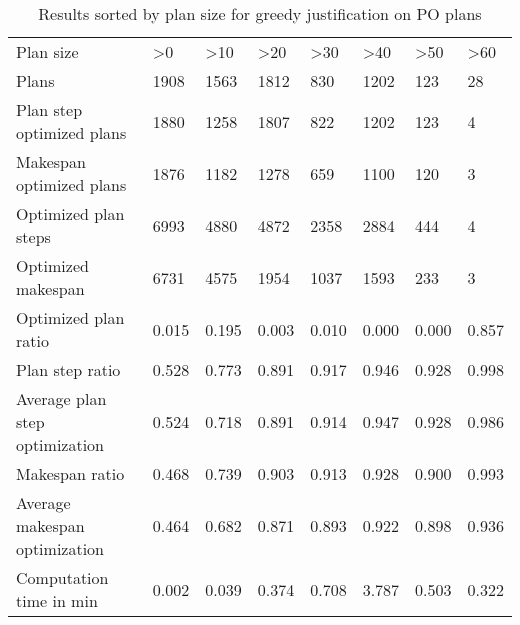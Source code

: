 \begin{table}[]
\begin{tabular}{llllllll}
\cline{1-8}
Plan size                     & \textgreater{}0 & \textgreater{}10 & \textgreater{}20 & \textgreater{}30 & \textgreater{}40 & \textgreater{}50 & \textgreater{}60 \\ \cline{1-8}
Plans                          & 1908            & 1563             & 1812             & 830              & 1202             & 123              & 28               \\
Plan step optimized plans      & 1880            & 1258             & 1807             & 822              & 1202             & 123              & 4                \\
Makespan optimized plans       & 1876            & 1182             & 1278             & 659              & 1100             & 120              & 3                \\
Optimized plan steps           & 6993            & 4880             & 4872             & 2358             & 2884             & 444              & 4                \\
Optimized makespan             & 6731            & 4575             & 1954             & 1037             & 1593             & 233              & 3                \\
Optimized plan ratio           & 0.015           & 0.195            & 0.003            & 0.010            & 0.000            & 0.000            & 0.857            \\
Plan step ratio                & 0.528           & 0.773            & 0.891            & 0.917            & 0.946            & 0.928            & 0.998            \\
Average plan step optimization & 0.524           & 0.718            & 0.891            & 0.914            & 0.947            & 0.928            & 0.986            \\
Makespan ratio                 & 0.468           & 0.739            & 0.903            & 0.913            & 0.928            & 0.900            & 0.993            \\
Average makespan optimization  & 0.464           & 0.682            & 0.871            & 0.893            & 0.922            & 0.898            & 0.936            \\
Computation time in min        & 0.002           & 0.039            & 0.374            & 0.708            & 3.787            & 0.503            & 0.322           
\end{tabular}
\caption{Results sorted by plan size for greedy justification on PO plans}
\end{table}


